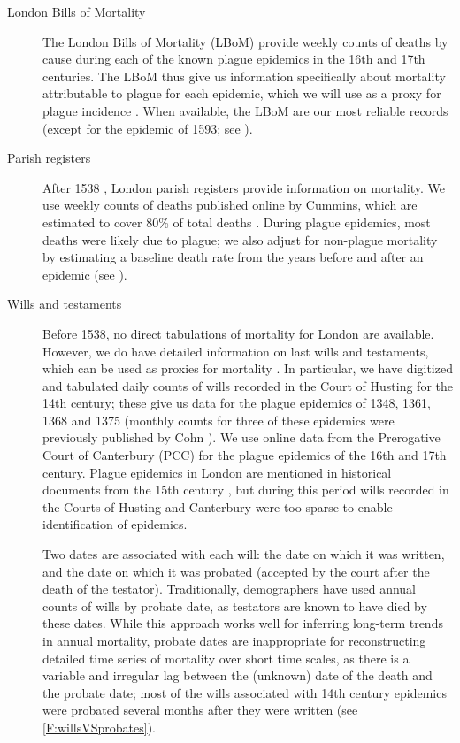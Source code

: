 \begin{description}
\item[London Bills of Mortality] The London Bills of Mortality \cite{Crei65,Tien+11} (LBoM) provide weekly counts of deaths by cause during each of the known plague epidemics in the 16th and 17th centuries.  The LBoM thus give us information specifically about mortality attributable to plague for each epidemic, which we will use as a proxy for plague incidence \cite{KermMcKe27,Ma+14}.  When available, the LBoM are our most reliable records (except for the epidemic of 1593; see \supp).
\item[Parish registers] After 1538 \cite[p.\,54]{Slac90}, London parish registers provide information on mortality.
We use weekly counts of deaths published online by Cummins, which are estimated to cover 80\% of total deaths \cite{Cumm+16}. During plague epidemics, most deaths were likely due to plague; we also adjust for non-plague mortality by estimating a baseline death rate from the years before and after an epidemic (see \Methodslink).
\hypertarget{mainsec:Data.wills}{}
\item[Wills and testaments] Before 1538, no direct tabulations of mortality for London are available. However, we do have detailed information on last wills and testaments, which can be used as proxies for mortality \cite{Slac90}. In particular, we have digitized and tabulated daily counts of wills recorded in the Court of Husting \cite{Shar1889} for the 14th century; these give us data for the plague epidemics of 1348, 1361, 1368 and 1375 (monthly counts for three of these epidemics were previously published by Cohn \cite{Cohn03}). We use online data from the Prerogative Court of Canterbury (PCC) \cite{Archives2018} 
for the plague epidemics of the 16th and 17th century.  Plague epidemics in London are mentioned in historical documents from the 15th century \cite[Ch.\,IV]{Crei65}, but during this period wills recorded in the Courts of Husting and Canterbury were too sparse to enable identification of epidemics.

Two dates are associated with each will: the date on which it was written, and the date on which it was probated (\ie accepted by the court after the death of the testator). Traditionally, demographers have used annual counts of wills by probate date, as testators are known to have died by these dates. While this approach works well for inferring long-term trends in annual mortality, probate dates are inappropriate for reconstructing detailed time series of mortality over short time scales, as there is a variable and irregular lag between the (unknown) date of the death and the probate date; most of the wills associated with 14th century epidemics were probated several months after they were written \cite{Bush19} (see \cref{F:willsVSprobates}).
  

\end{description}
